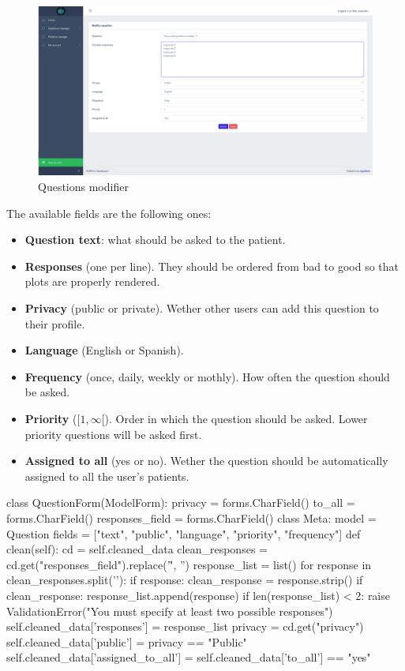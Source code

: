 \documentclass[12pt,english]{article}
\begin{document}
\begin{figure}[H]
  \centering
    \includegraphics[width=\textwidth]{questions_modifier.png}
  \caption{Questions modifier}
\end{figure}
The available fields are the following ones:
\begin{itemize}
  \item \textbf{Question text}: what should be asked to the patient.
  \item \textbf{Responses} (one per line). They should be ordered from bad to good so that plots are properly rendered.
  \item \textbf{Privacy} (public or private). Wether other users can add this question to their profile.
  \item \textbf{Language} (English or Spanish).
  \item \textbf{Frequency} (once, daily, weekly or mothly). How often the question should be asked.
  \item \textbf{Priority} ($[1,\infty[$). Order in which the question should be asked. Lower priority questions will be asked first.
  \item \textbf{Assigned to all} (yes or no). Wether the question should be automatically assigned to all the user's patients.
\end{itemize}

\begin{python}[caption={Form to create or modify questions}, captionpos=b]
class QuestionForm(ModelForm):
    privacy = forms.CharField()
    to_all = forms.CharField()
    responses_field = forms.CharField()
    class Meta:
        model = Question
        fields = ["text", "public", "language", "priority", "frequency"]
    def clean(self):
        cd = self.cleaned_data
        clean_responses = cd.get("responses_field").replace('\r', '')
        response_list = list()
        for response in clean_responses.split('\n'):
            if response:
                clean_response = response.strip()
                if clean_response:
                    response_list.append(response)
        if len(response_list) < 2:
            raise ValidationError("You must specify at least two possible responses")
        self.cleaned_data['responses'] = response_list
        privacy = cd.get("privacy")
        self.cleaned_data['public'] = privacy == "Public"
        self.cleaned_data['assigned_to_all'] = self.cleaned_data['to_all'] == "yes"
\end{python}
\end{document}
